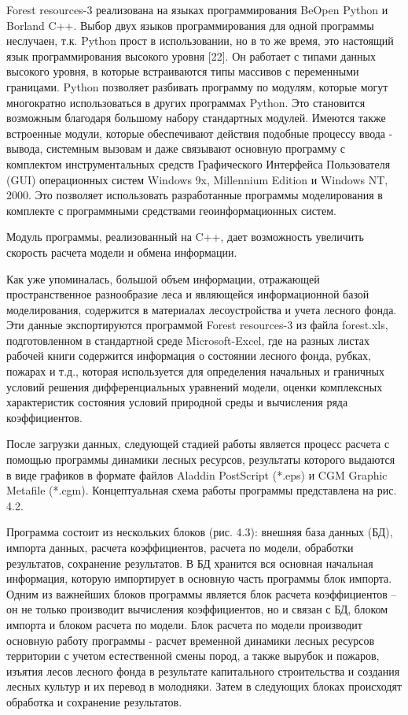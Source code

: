 \documentclass{report}
\begin{document}
Forest resources{}-3 реализована на языках программирования BeOpen Python и Borland C++. Выбор двух языков
программирования для одной программы неслучаен, т.к. Python прост в использовании, но в то же время, это настоящий язык
программирования высокого уровня [22]. Он работает с типами данных высокого уровня, в которые встраиваются типы
массивов с переменными границами. Python позволяет разбивать программу по модулям, которые могут многократно
использоваться в других программах Python. Это становится возможным благодаря большому набору стандартных модулей.
Имеются также встроенные модули, которые обеспечивают действия подобные процессу ввода - вывода, системным вызовам и
даже связывают основную программу с комплектом инструментальных средств Графического Интерфейса Пользователя (GUI)
операционных систем Windows 9x, Millennium Edition и Windows NT, 2000. Это позволяет использовать разработанные
программы моделирования в комплекте с программными средствами геоинформационных систем. 

Модуль программы, реализованный на C++, дает возможность увеличить скорость расчета модели и обмена информации.

Как уже упоминалась, большой объем информации, отражающей пространственное разнообразие леса и являющейся информационной
базой моделирования, содержится в материалах лесоустройства и учета лесного фонда. Эти данные экспортируются программой
Forest resources{}-3 из файла forest.xls, подготовленном в стандартной среде Microsoft{}-Excel, где на разных листах
рабочей книги содержится информация о состоянии лесного фонда, рубках, пожарах и т.д., которая используется для
определения начальных и граничных условий решения дифференциальных уравнений мо\-дели, оценки комплексных характеристик
состояния условий при\-родной среды и вычисления ряда коэффициентов.

После загрузки данных, следующей стадией работы является процесс расчета с помощью программы динамики лесных ресурсов,
результаты которого выдаются в виде графиков в формате файлов Aladdin PostScript (*.eps) и CGM Graphic Metafile
(*.cgm). Концептуальная схема работы программы представлена на рис. 4.2.

Программа состоит из нескольких блоков (рис. 4.3): внешняя база данных (БД), импорта данных, расчета коэффициентов,
расчета по модели, обработки результатов, сохранение результатов. В БД хранится вся основная начальная информация,
которую импортирует в основную часть программы блок импорта. Одним из важнейших блоков программы является блок расчета
коэффициентов – он не только производит вычисления коэффициентов, но и связан с БД, блоком импорта и блоком расчета по
модели. Блок расчета по модели производит основную работу программы - расчет временной динамики лесных ресурсов
территории с учетом естественной смены пород, а также вырубок и пожаров, изъятия лесов лесного фонда в результате
капитального строительства и создания лесных культур и их перевод в молодняки. Затем в следующих блоках происходят
обработка и сохранение результатов.
\end{document}
